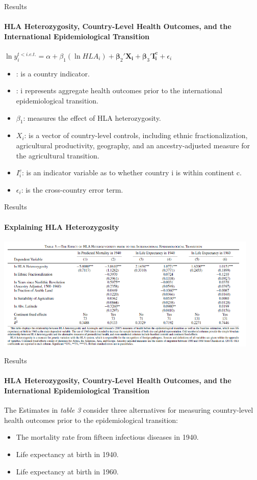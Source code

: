 \documentclass[pdftex,12pt,xcolor=pdftex,table]{beamer}
\theoremstyle{definition}
\theoremstyle{remark}
\numberwithin{equation}{section}
\numberwithin{figure}{section}
\begin{document}
\begin{frame}{Results}
\framesubtitle{HLA Heterozygosity, Country-Level Health Outcomes, and the International Epidemiological Transition}
\justifying

\centering
    $\ln y_{i}^{t<i.e.t.}=\alpha+\beta_{1}(\ln HLA_{i})+\boldsymbol{\beta}_{2}'\mathbf{X_{i}}+\boldsymbol{\beta}_{3}'\mathbf{I_{i}^{c}}+\epsilon_{i}$
\pause
\begin{itemize}
\item {}: is a country indicator.
\item {}: i represents aggregate health outcomes prior to the international epidemiological transition.
\item \textbf{$\beta_{1}$}: measures the effect of HLA heterozygosity.
\item $X_{i}$: is a vector of country-level controls, including ethnic fractionalization, agricultural productivity, geography, and an ancestry-adjusted measure for the agricultural transition.
\item $I^{c}_{i}$: is an indicator variable as to whether country i is within continent c.
 \item {$\epsilon_{i}$}: is the cross-country error term. 
\end{itemize}
\end{frame}


\begin{frame}{Results}
\framesubtitle{Explaining HLA Heterozygosity}
\justifying
\includegraphics[height=5.45cm]{Table_3.PNG}
\end{frame}

\begin{frame}{Results}
\framesubtitle{HLA Heterozygosity, Country-Level Health Outcomes, and the International Epidemiological Transition}
\justifying
The Estimates in \textit{table 3} consider three alternatives for measuring country-level health outcomes prior to the epidemiological transition: 
\pause
\begin{itemize}
    \item The mortality rate from fifteen infectious diseases in 1940.
    \pause
    \item Life expectancy at birth in 1940.
    \pause
    \item Life expectancy at birth in 1960.
\end{itemize}
\end{frame}
\end{document}
